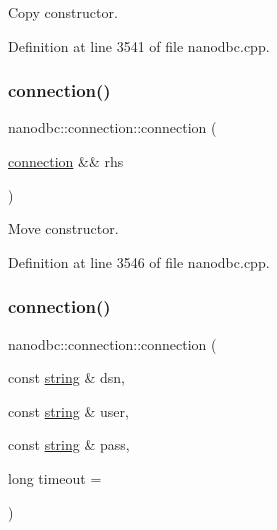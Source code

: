 Copy constructor. 



Definition at line 3541 of file nanodbc.\+cpp.

\mbox{\label{classnanodbc_1_1connection_a6d3081d73935e5e5964b5e1937d2fbb5}} 
\subsubsection{\texorpdfstring{connection()}{connection()}\hspace{0.1cm}{\footnotesize\ttfamily [3/5]}}
{\footnotesize\ttfamily nanodbc\+::connection\+::connection (\begin{DoxyParamCaption}\item[{\mbox{\hyperlink{classnanodbc_1_1connection}{connection}} \&\&}]{rhs }\end{DoxyParamCaption})\hspace{0.3cm}{\ttfamily [noexcept]}}



Move constructor. 



Definition at line 3546 of file nanodbc.\+cpp.

\mbox{\label{classnanodbc_1_1connection_ad61afea16c994599c792f5c74ce7c93b}} 
\subsubsection{\texorpdfstring{connection()}{connection()}\hspace{0.1cm}{\footnotesize\ttfamily [4/5]}}
{\footnotesize\ttfamily nanodbc\+::connection\+::connection (\begin{DoxyParamCaption}\item[{const \mbox{\hyperlink{namespacenanodbc_abfc0ece56278e590911ec8352774c212}{string}} \&}]{dsn,  }\item[{const \mbox{\hyperlink{namespacenanodbc_abfc0ece56278e590911ec8352774c212}{string}} \&}]{user,  }\item[{const \mbox{\hyperlink{namespacenanodbc_abfc0ece56278e590911ec8352774c212}{string}} \&}]{pass,  }\item[{long}]{timeout = {} }\end{DoxyParamCaption})}



